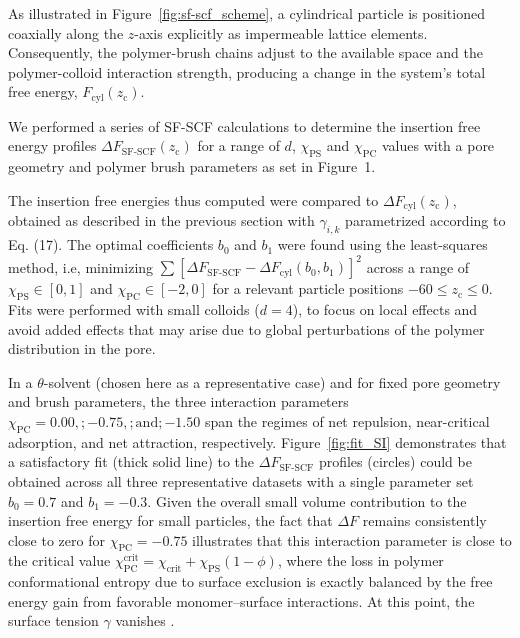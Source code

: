 \documentclass[10pt, a4paper, twocolumn]{article}
\begin{document}
As illustrated in Figure~\ref{fig:sf-scf_scheme}, a cylindrical particle is positioned coaxially along the $z$-axis explicitly as impermeable lattice elements.
Consequently, the polymer-brush chains adjust to the available space and the polymer-colloid interaction strength, producing a change in the system's total free energy, $F_{\text{cyl}}(z_{\text{c}})$.

We performed a series of SF-SCF calculations to determine the insertion free energy profiles $\Delta F_{\text{SF-SCF}}(z_{\text{c}})$ for a range of $d$, $\chi_{\text{PS}}$ and $\chi_{\text{PC}}$ values with a pore geometry and polymer brush parameters as set in Figure~1.

The insertion free energies thus computed were compared to $\Delta F_{\text{cyl}}(z_{\text{c}})$, obtained as described in the previous section with $\gamma_{i,k}$ parametrized according to Eq. (17).
The optimal coefficients $b_0$ and $b_1$ were found using the least-squares method, i.e, minimizing $\sum [\Delta F_{\text{SF-SCF}} - \Delta F_{\text{cyl}}(b_0,b_1)]^2$ across a range of $\chi_{\text{PS}} \in [0,1]$  and $\chi_{\text{PC}} \in [-2,0]$ for a relevant particle positions $-60 \leq z_{\text{c}} \leq 0$.
Fits were performed with small colloids ($d=4$), to focus on local effects and avoid added effects that may arise due to global perturbations of the polymer distribution in the pore.

In a $\theta$-solvent (chosen here as a representative case) and for fixed pore geometry and brush parameters, the three interaction parameters
$\chi_{\text{PC}} = 0.00,; -0.75,; \text{and}; -1.50$ span the regimes of net repulsion, near-critical adsorption, and net attraction, respectively.
Figure~\ref{fig:fit_SI} demonstrates that a satisfactory fit (thick solid line) to the $\Delta F_{\text{SF-SCF}}$ profiles (circles) could be obtained across all three representative datasets with a single parameter set $b_0 = 0.7$ and $b_1 = -0.3$.
Given the overall small volume contribution to the insertion free energy for small particles, the fact that $\Delta F$ remains consistently close to zero for $\chi_{\text{PC}} = -0.75$ illustrates that this interaction parameter is close to the critical value $\chi_{\text{PC}}^{\text{crit}} = \chi_{\text{crit}} + \chi_{\text{PS}} (1 - \phi)$, where the loss in polymer conformational entropy due to surface exclusion is exactly balanced by the free energy gain from favorable monomer–surface interactions. At this point, the surface tension $\gamma$ vanishes \cite{Fleer1993, Birshtein1979, Birshtein1983, Eisenriegler1982}.
\end{document}
